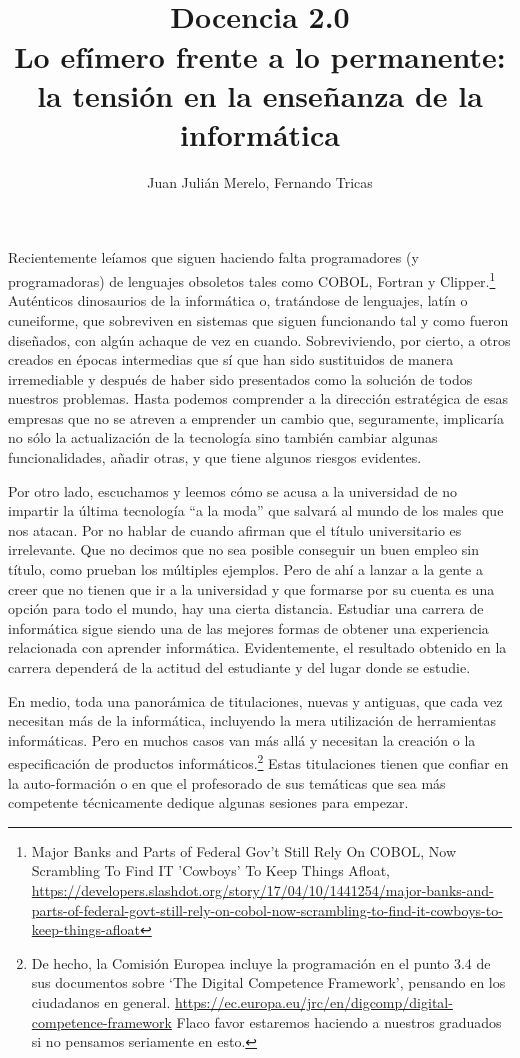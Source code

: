 \documentclass[twoside,10pt]{article}
\title{\ \\ Docencia 2.0\\ \LARGE Lo efímero frente a lo permanente:
la tensión en la enseñanza de la informática}
\author{\large Juan Julián Merelo, Fernando Tricas}
\date{}
\begin{document}
\maketitle
\vspace*{-5ex}

\addtocounter{page}{6}
\begin{multicols}{2}

Recientemente leíamos que siguen haciendo falta programadores (y
programadoras) de lenguajes obsoletos tales como COBOL, Fortran y
Clipper.\footnote{Major Banks and Parts of Federal Gov't Still Rely On
COBOL, Now Scrambling To Find IT 'Cowboys' To Keep Things Afloat,
\url{https://developers.slashdot.org/story/17/04/10/1441254/major-banks-and-parts-of-federal-govt-still-rely-on-cobol-now-scrambling-to-find-it-cowboys-to-keep-things-afloat}}
Auténticos dinosaurios de la informática o, tratándose de lenguajes,
latín o cuneiforme, que sobreviven en sistemas que siguen funcionando
tal y como fueron diseñados, con algún achaque de vez en cuando.
Sobreviviendo, por cierto, a otros creados en épocas intermedias que
sí que han sido sustituidos de manera irremediable y después de haber
sido presentados como la solución de todos nuestros problemas.  Hasta
podemos comprender a la dirección estratégica de esas empresas que no
se atreven a emprender un cambio que, seguramente, implicaría no sólo
la actualización de la tecnología sino también cambiar algunas
funcionalidades, añadir otras, y que tiene algunos riesgos evidentes.

Por otro lado, escuchamos y leemos cómo se acusa a la universidad de
no impartir la última tecnología ``a la moda'' que salvará al mundo de
los males que nos atacan.
Por no hablar de cuando afirman que el título universitario es
irrelevante. Que no decimos que no sea posible conseguir un buen
empleo sin título, como prueban los múltiples ejemplos. Pero de ahí a
lanzar a la gente a creer que no tienen que ir a la universidad y que
formarse por su cuenta es una opción para todo el mundo, hay una
cierta distancia. Estudiar una carrera de informática sigue siendo una
de las mejores formas de obtener una experiencia relacionada con 
aprender informática. Evidentemente, el resultado obtenido en la
carrera dependerá de la actitud del estudiante y del lugar donde se
estudie. 

En medio, toda una panorámica de titulaciones, nuevas y
antiguas, que cada vez necesitan más de la informática, incluyendo la
mera
utilización de herramientas informáticas. Pero en muchos casos van más
	allá y necesitan la creación o la especificación de productos
informáticos.\footnote{De hecho, la Comisión Europea incluye la
programación en el punto 3.4 de sus documentos sobre `The Digital
Competence Framework', pensando en los ciudadanos en general. 
\url{https://ec.europa.eu/jrc/en/digcomp/digital-competence-framework}
Flaco favor estaremos haciendo a nuestros graduados si no pensamos
seriamente en esto.}
Estas titulaciones tienen que confiar en la auto-formación o en que el
profesorado de sus temáticas que sea más competente técnicamente
dedique algunas sesiones para empezar.


\end{multicols}
\end{document}
